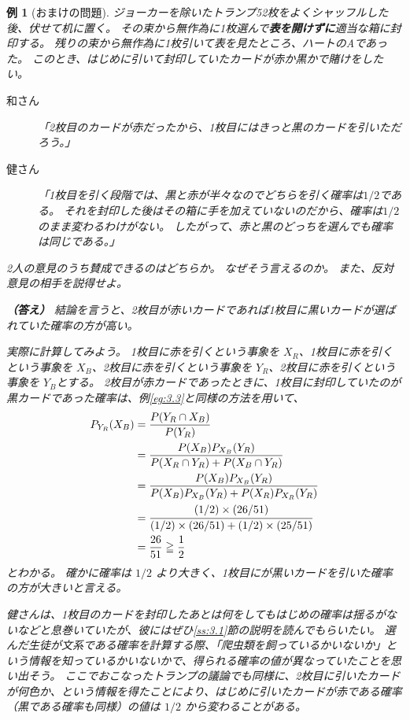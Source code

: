 \documentclass[12pt]{ltjsarticle}\usepackage{ifthen}\newcounter{enlarge}\setcounter{enlarge}{1}
\newtheorem{eg}{例}
\begin{document}
\begin{eg}[おまけの問題]
  ジョーカーを除いたトランプ52枚をよくシャッフルした後、伏せて机に置く。
  その束から無作為に1枚選んで\textbf{表を開けずに}適当な箱に封印する。
  残りの束から無作為に1枚引いて表を見たところ、ハートのAであった。
  このとき、はじめに引いて封印していたカードが赤か黒かで賭けをしたい。
  \begin{description}
  \item[和さん]  「2枚目のカードが赤だったから、1枚目にはきっと黒のカードを引いただろう。」
  \item[健さん]  「1枚目を引く段階では、黒と赤が半々なのでどちらを引く確率は$1/2$である。
    それを封印した後はその箱に手を加えていないのだから、確率は$1/2$のまま変わるわけがない。
    したがって、赤と黒のどっちを選んでも確率は同じである。」
  \end{description}

  2人の意見のうち賛成できるのはどちらか。
  なぜそう言えるのか。
  また、反対意見の相手を説得せよ。

  \textbf{（答え）}
  結論を言うと、2枚目が赤いカードであれば1枚目に黒いカードが選ばれていた確率の方が高い。

  実際に計算してみよう。
  1枚目に赤を引くという事象を $X_R$、1枚目に赤を引くという事象を $X_B$、2枚目に赤を引くという事象を $Y_R$、2枚目に赤を引くという事象を $Y_B$とする。
  2枚目が赤カードであったときに、1枚目に封印していたのが黒カードであった確率は、例\ref{eg:3.3}と同様の方法を用いて、
  \begin{align}
    P_{Y_R } (X_B) &= \frac{P(Y_R \cap X_B )}{P(Y_R )} \notag \\
                    &= \frac{P(X_B ) P_{X_B} (Y_R )}{P(X_R \cap Y_R) + P(X_B \cap Y_R) } \notag \\
                    &= \frac{P(X_B ) P_{X_B} (Y_R )}{P(X_B ) P_{X_B} (Y_R ) + P(X_R ) P_{X_R} (Y_R ) } \notag \\
                    &= \cfrac{(1/2) \times (26/51)}{(1/2) \times (26/51) + (1/2) \times (25/51) } \notag \\
                    &= \frac{26}{51} \geqq \frac{1}{2} 
  \end{align}
  とわかる。
  確かに確率は $1/2$ より大きく、1枚目にが黒いカードを引いた確率の方が大きいと言える。

  健さんは、1枚目のカードを封印したあとは何をしてもはじめの確率は揺るがないなどと息巻いていたが、彼にはぜひ\ref{ss:3.1}節の説明を読んでもらいたい。
  選んだ生徒が文系である確率を計算する際、「爬虫類を飼っているかいないか」という情報を知っているかいないかで、得られる確率の値が異なっていたことを思い出そう。
  ここでおこなったトランプの議論でも同様に、2枚目に引いたカードが何色か、という情報を得たことにより、はじめに引いたカードが赤である確率（黒である確率も同様）の値は $1/2$ から変わることがある。
\end{eg}
\end{document}
